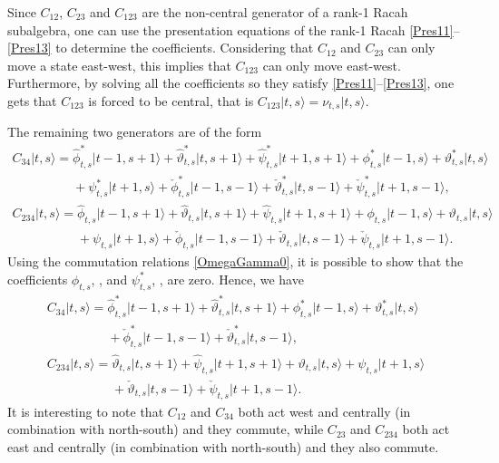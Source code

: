 \documentclass[pdftex]{sigma}
\numberwithin{equation}{section}
\begin{document}
Since $C_{12}$, $C_{23}$ and $C_{123}$ are the non-central generator of a rank-1 Racah subalgebra, one can use the presentation equations of the rank-1 Racah \eqref{Pres11}--\eqref{Pres13} to determine the coefficients. Considering that $C_{12}$ and $C_{23}$ can only move a state east-west, this implies that $C_{123}$ can only move east-west. Furthermore, by solving all the coefficients so they satisfy \eqref{Pres11}--\eqref{Pres13}, one gets that $C_{123}$ is forced to be central, that is
$
C_{123}\vert t,s\rangle =\nu_{t,s}\vert t,s\rangle$.

The remaining two generators are of the form
\begin{gather*}
C_{34}\vert t,s\rangle =\hat{\phi}^*_{t,s}\vert t-1,s+1\rangle+\hat{\vartheta}^*_{t,s}\vert t,s+1\rangle+\hat{\psi}^*_{t,s}\vert t+1,s+1\rangle+\phi^*_{t,s}\vert t-1,s\rangle+\vartheta^*_{t,s}\vert t,s\rangle\\
\phantom{C_{34}\vert t,s\rangle =}{}+\psi^*_{t,s}\vert t+1,s\rangle
+\check{\phi}^*_{t,s}\vert t-1,s-1\rangle+\check{\vartheta}^*_{t,s}\vert t,s-1\rangle+\check{\psi}^*_{t,s}\vert t+1,s-1\rangle,\\
C_{234}\vert t,s\rangle =\hat{\phi}_{t,s}\vert t-1,s+1\rangle+\hat{\vartheta}_{t,s}\vert t,s+1\rangle+\hat{\psi}_{t,s}\vert t+1,s+1\rangle+\phi_{t,s}\vert t-1,s\rangle+\vartheta_{t,s}\vert t,s\rangle\\
\phantom{C_{234}\vert t,s\rangle =}{}+\psi_{t,s}\vert t+1,s\rangle
+\check{\phi}_{t,s}\vert t-1,s-1\rangle+\check{\vartheta}_{t,s}\vert t,s-1\rangle+\check{\psi}_{t,s}\vert t+1,s-1\rangle.
\end{gather*}
Using the commutation relations \eqref{OmegaGamma0}, it is possible to show that the coefficients $\phi_{t,s}$, ,  and $\psi^*_{t,s}$, ,  are zero. Hence, we have
\begin{gather*}
C_{34}\vert t,s\rangle =\hat{\phi}^*_{t,s}\vert t-1,s+1\rangle+\hat{\vartheta}^*_{t,s}\vert t,s+1\rangle
+\phi^*_{t,s}\vert t-1,s\rangle+\vartheta^*_{t,s}\vert t,s\rangle\\
\phantom{C_{34}\vert t,s\rangle =}{}+\check{\phi}^*_{t,s}\vert t-1,s-1\rangle+\check{\vartheta}^*_{t,s}\vert t,s-1\rangle,\\
C_{234}\vert t,s\rangle =\hat{\vartheta}_{t,s}\vert t,s+1\rangle+\hat{\psi}_{t,s}\vert t+1,s+1\rangle
+\vartheta_{t,s}\vert t,s\rangle+\psi_{t,s}\vert t+1,s\rangle\\
\phantom{C_{234}\vert t,s\rangle =}{}+\check{\vartheta}_{t,s}\vert t,s-1\rangle+\check{\psi}_{t,s}\vert t+1,s-1\rangle.
\end{gather*}
It is interesting to note that $C_{12}$ and $C_{34}$ both act west and centrally (in combination with north-south) and they commute, while $C_{23}$ and $C_{234}$ both act east and centrally (in combination with north-south) and they also commute.
\end{document}
